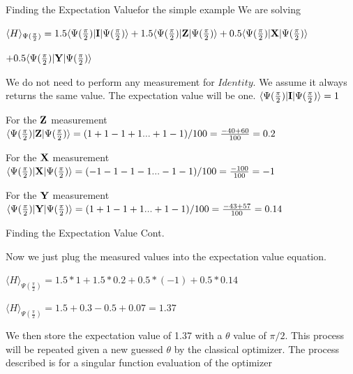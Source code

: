 \begin{frame}{Finding the Expectation Value}{for the simple example}
We are solving 

$ \langle H \rangle_{\Psi(\frac{\pi}{2})} =1.5 \langle \Psi(\frac{\pi}{2}) | \mbox{\bfseries{\textrm{I}}} | \Psi(\frac{\pi}{2}) \rangle + 1.5 \langle \Psi(\frac{\pi}{2}) |  \mbox{\bfseries{\textrm{Z}}} | \Psi(\frac{\pi}{2}) \rangle + 0.5 \langle \Psi(\frac{\pi}{2}) |  \mbox{\bfseries{\textrm{X}}}| \Psi(\frac{\pi}{2}) \rangle $
 \vspace{4mm}
 
 $ + 0.5 \langle \Psi(\frac{\pi}{2}) |\mbox{\bfseries{\textrm{Y}}}| \Psi(\frac{\pi}{2}) \rangle$
 \vspace{1mm}

We do not need to perform any measurement for $Identity$. We assume it always returns the same value. The expectation value will be  one. 
 $\langle \Psi(\frac{\pi}{2}) | \mbox{\bfseries{\textrm{I}}} | \Psi(\frac{\pi}{2}) \rangle = 1 $
 \vspace{2mm}

For the $\mbox{\bfseries{\textrm{Z}}}$ measurement 
 $\langle \Psi(\frac{\pi}{2}) |  \mbox{\bfseries{\textrm{Z}}} | \Psi(\frac{\pi}{2}) \rangle = (1 + 1 -1 + 1... +1 -1) / 100 = \frac{-40 + 60}{100} = 0.2 $
 \vspace{2mm} 

For the $\mbox{\bfseries{\textrm{X}}}$ measurement 
$\langle \Psi(\frac{\pi}{2}) |  \mbox{\bfseries{\textrm{X}}} | \Psi(\frac{\pi}{2}) \rangle = (-1 - 1 -1 - 1... -1 -1) / 100 = \frac{-100}{100} = -1 $
\vspace{2mm}

For the $\mbox{\bfseries{\textrm{Y}}}$ measurement 
 $\langle \Psi(\frac{\pi}{2}) |  \mbox{\bfseries{\textrm{Y}}} | \Psi(\frac{\pi}{2}) \rangle = (1 + 1 -1 + 1... +1 -1) / 100 = \frac{-43 + 57}{100} = 0.14 $
\vspace{2mm}

\end{frame}

\begin{frame}{Finding the Expectation Value Cont.}

Now we just plug the measured values into the expectation value equation.
\vspace{2mm}

 $\langle H \rangle_{\Psi(\frac{\pi}{2})} =1.5*1+ 1.5*0.2 + 0.5*(-1) + 0.5*0.14$
 \vspace{2mm}

  $\langle H \rangle_{\Psi(\frac{\pi}{2})} =1.5+ 0.3 - 0.5 + 0.07 = 1.37$
 \vspace{2mm}

 We then store the expectation value of 1.37 with a $\theta$ value of $\pi/2$. This process will be repeated given a new guessed $\theta$ by the classical optimizer. The process described is for a singular function evaluation of the optimizer
    
\end{frame}



